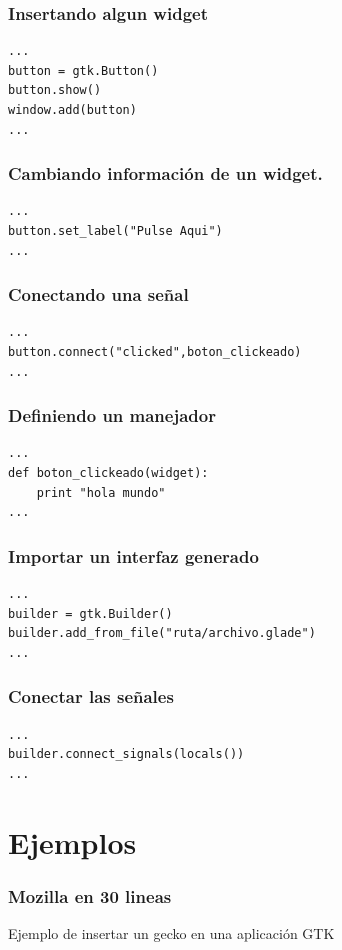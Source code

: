 \documentclass[10pt]{beamer}
\begin{document}
  \begin{frame}[containsverbatim]
    \frametitle{Insertando algun widget}
    \begin{verbatim}
...
button = gtk.Button()
button.show()
window.add(button)
...
    \end{verbatim}
  
  \end{frame}
  
  \begin{frame}[containsverbatim]
    \frametitle{Cambiando información de un widget.}
    \begin{verbatim}
...
button.set_label("Pulse Aqui")
...
    \end{verbatim}
  \end{frame}
  
  \begin{frame}[containsverbatim]
    \frametitle{Conectando una señal}
    \begin{verbatim}
...
button.connect("clicked",boton_clickeado)
...
    \end{verbatim}
  \end{frame}

  \begin{frame}[containsverbatim]
    \frametitle{Definiendo un manejador}
    \begin{verbatim}
...
def boton_clickeado(widget):
	print "hola mundo"
...
    \end{verbatim}
  \end{frame}

  \begin{frame}[containsverbatim]
    \frametitle{Importar un interfaz generado}
    \begin{verbatim}
...
builder = gtk.Builder()
builder.add_from_file("ruta/archivo.glade")
...
    \end{verbatim}
  \end{frame}

  \begin{frame}[containsverbatim]
    \frametitle{Conectar las señales}
    \begin{verbatim}
...
builder.connect_signals(locals())
...
    \end{verbatim}
  \end{frame}

  \section{Ejemplos}

  \begin{frame}[containsverbatim]
    \frametitle{Mozilla en 30 lineas}
    Ejemplo de insertar un gecko en una aplicación GTK
  \end{frame}
\end{document}
